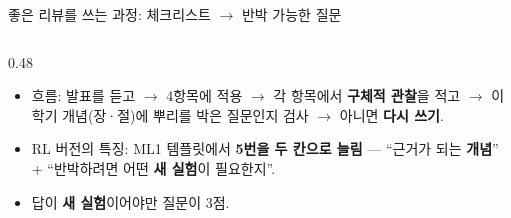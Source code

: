 \begin{frame}{좋은 리뷰를 쓰는 과정: 체크리스트 $\to$ 반박 가능한 질문}
  \begin{columns}[T]
    \begin{column}{0.48\textwidth}
      \begin{itemize}
        \item 흐름: 발표를 듣고 $\to$ 4항목에 적용 $\to$ 각 항목에서
          \textbf{구체적 관찰}을 적고 $\to$ 이 학기 개념(장·절)에
          뿌리를 박은 질문인지 검사 $\to$ 아니면 \textbf{다시 쓰기}.
        \item RL 버전의 특징: ML1 템플릿에서 \textbf{5번을 두 칸으로
          늘림} --- ``근거가 되는 \textbf{개념}'' + ``반박하려면 어떤
          \textbf{새 실험}이 필요한지''.
        \item 답이 \textbf{새 실험}이어야만 질문이 3점.
      \end{itemize}
    \end{column}
  \end{columns}
\end{frame}
